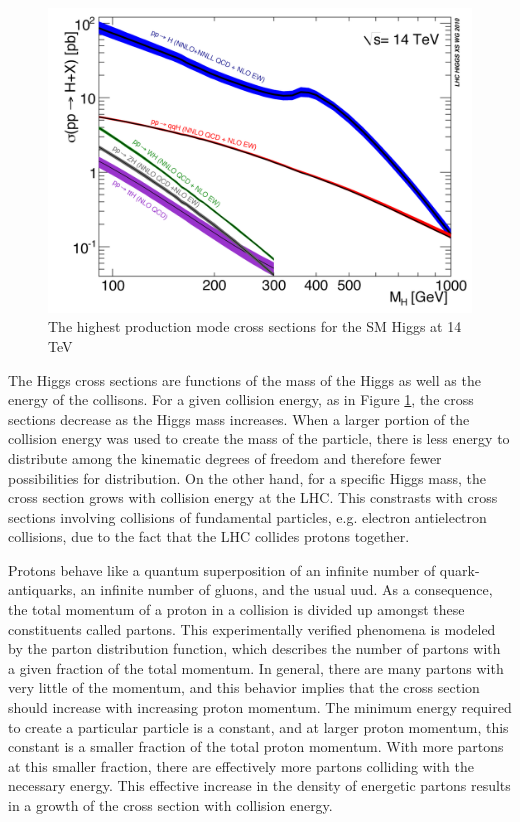 \documentclass[12pt]{article}
\begin{document}
\begin{figure}[h!]
  \centering
  \includegraphics[width=5in]{images/14TeV_higgs_cross_sections.png}
  \caption
   {The highest production mode cross sections for the SM Higgs at 14 TeV \cite{crossbranchplots}}
  \label{fig:hprodcross}
\end{figure}

The Higgs cross sections are functions of the mass of the Higgs as well as the energy of the collisons. For a given collision energy, as in Figure \ref{fig:hprodcross}, the cross sections decrease as the Higgs mass increases. When a larger portion of the collision energy was used to create the mass of the particle, there is less energy to distribute among the kinematic degrees of freedom and therefore fewer possibilities for distribution. On the other hand, for a specific Higgs mass, the cross section grows with collision energy at the LHC. This constrasts with cross sections involving collisions of fundamental particles, e.g. electron antielectron collisions, due to the fact that the LHC collides protons together. 

Protons behave like a quantum superposition of an infinite number of quark-antiquarks, an infinite number of gluons, and the usual uud. As a consequence, the total momentum of a proton in a collision is divided up amongst these constituents called partons. This experimentally verified phenomena is modeled by the parton distribution function, which describes the number of partons with a given fraction of the total momentum. In general, there are many partons with very little of the momentum, and this behavior implies that the cross section should increase with increasing proton momentum. The minimum energy required to create a particular particle is a constant, and at larger proton momentum, this constant is a smaller fraction of the total proton momentum. With more partons at this smaller fraction, there are effectively more partons colliding with the necessary energy. This effective increase in the density of energetic partons results in a growth of the cross section with collision energy. 
\end{document}
